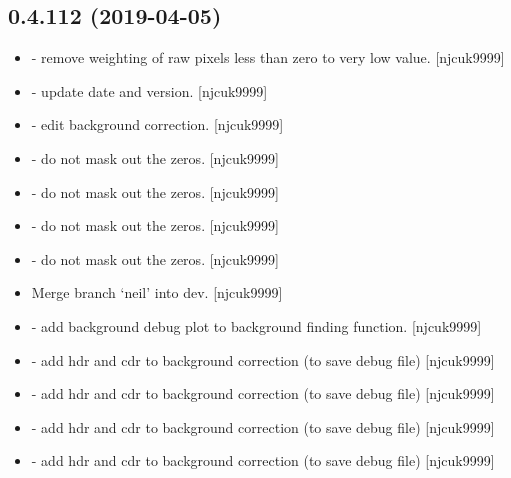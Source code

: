 \documentclass[a4paper,10pt,english]{report}
\begin{document}
\subsection{0.4.112 (2019-04-05)}
\label{\detokenize{misc/changelog:id148}}\begin{itemize}
\item {} 
 - remove weighting of raw pixels less than zero to very
low value. {[}njcuk9999{]}

\item {} 
 - update date and version. {[}njcuk9999{]}

\item {} 
 - edit background correction. {[}njcuk9999{]}

\item {} 
 - do not mask out the zeros. {[}njcuk9999{]}

\item {} 
 - do not mask out the zeros. {[}njcuk9999{]}

\item {} 
 - do not mask out the zeros. {[}njcuk9999{]}

\item {} 
 - do not mask out the zeros. {[}njcuk9999{]}

\item {} 
Merge branch ‘neil’ into dev. {[}njcuk9999{]}

\item {} 
 - add background debug plot to background finding
function. {[}njcuk9999{]}

\item {} 
 - add hdr and cdr to background correction (to save
debug file) {[}njcuk9999{]}

\item {} 
 - add hdr and cdr to background correction (to
save debug file) {[}njcuk9999{]}

\item {} 
 - add hdr and cdr to background correction
(to save debug file) {[}njcuk9999{]}

\item {} 
 - add hdr and cdr to background correction (to
save debug file) {[}njcuk9999{]}


\end{itemize}
\end{document}
